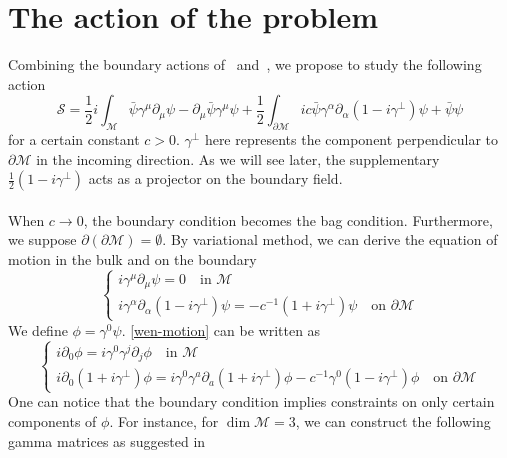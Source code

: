 \section{The action of the problem}
Combining the boundary actions of~\cite{Henningson1998} and~\cite{Contino2005}, we propose to study the following action
\begin{equation}\label{wen-action}
\mathcal{S} = \frac{1}{2}i\int_{\mathcal{M}} \bar{\psi} \gamma^\mu \partial_\mu \psi - \partial_\mu \bar{\psi} \gamma^\mu \psi 
+ \frac{1}{2}\int_{\partial \mathcal{M}} ic \bar{\psi} \gamma^\alpha \partial_\alpha (1 - i \gamma^\bot) \psi
+ \bar{\psi} \psi
\end{equation}
for a certain constant $c >0$. 
$\gamma^\bot$ here represents the component perpendicular to $\partial \mathcal{M}$ in the incoming direction. 
As we will see later, the supplementary $\frac 1 2 (1-i\gamma^\bot)$ acts as a projector on the boundary field.
\\\\
When $c \rightarrow 0$, the boundary condition becomes the bag condition. 
Furthermore, we suppose $\partial(\partial \mathcal{M}) = \emptyset$.
By variational method, we can derive the equation of motion in the bulk and on the boundary
\begin{equation}\label{wen-motion}
\begin{cases}
i \gamma^\mu \partial_\mu \psi = 0  \quad \textrm{in $\mathcal{M}$}\\
i \gamma^\alpha \partial_\alpha (1 - i\gamma^\bot) \psi = - c^{-1}(1 + i\gamma^{\bot}) \psi \quad \textrm{on $\partial \mathcal{M}$}
\end{cases}
\end{equation}
We define $\phi = \gamma^0 \psi$. 
\cref{wen-motion} can be written as 
\begin{equation}\label{wen-maineq}
\begin{cases}
i \partial_0 \phi = i \gamma^0 \gamma^j \partial_j \phi   \quad \textrm{in $\mathcal{M}$}\\
i \partial_0(1 + i\gamma^\bot) \phi = i\gamma^0 \gamma^a \partial_a (1+ i\gamma^\bot)\phi - c^{-1} \gamma^0(1 - i \gamma^{\bot})\phi \quad \textrm{on $\partial \mathcal{M}$}
\end{cases}
\end{equation}
One can notice that the boundary condition implies constraints on only certain components of $\phi$. 
For instance, for $\dim \mathcal{M} = 3$, we can construct the following gamma matrices as suggested in~\cite{Polchinski1998}
